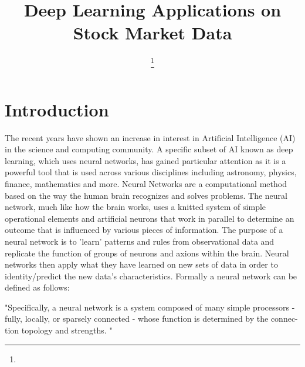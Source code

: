 \documentclass[twocolumn]{webofc}
\begin{document}
%
\title{Deep Learning Applications on Stock Market Data}
%
%

\author{ \fnsep\thanks{} 
      }


%
\maketitle
%

\section{Introduction}\label{sec:intro}

The recent years have shown an increase in interest in Artificial Intelligence (AI) in the science and computing community. A specific subset of AI known as deep learning, which uses neural networks, has gained particular attention as it is a powerful tool that is used across various disciplines including astronomy, physics, finance, mathematics and more. Neural Networks are a computational method based on the way the human brain recognizes and solves problems. The neural network, much like how the brain works, uses a knitted system of simple operational elements and artificial neurons that work in parallel to determine an outcome that is influenced by various pieces of information. The purpose of a neural network is to 'learn' patterns and rules from observational data and replicate the function of groups of neurons and axions within the brain. Neural networks then apply what they have learned on new sets of data in order to identity/predict the new data's characteristics. Formally a neural network can be defined as follows: 

"Specifically, a neural network is a system composed of many simple processors - fully, locally, or sparsely connected - whose function is determined by the connec- tion topology and strengths. " 
	
\end{document}
